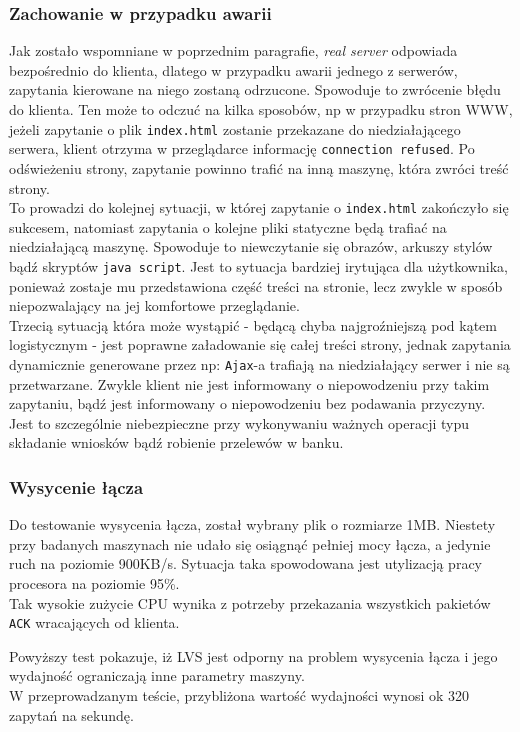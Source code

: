 \subsubsection*{Zachowanie w przypadku awarii}
Jak zostało wspomniane w poprzednim paragrafie, \textit{real server} odpowiada bezpośrednio do klienta, dlatego w przypadku awarii jednego z serwerów, zapytania kierowane na niego zostaną odrzucone.
Spowoduje to zwrócenie błędu do klienta. Ten może to odczuć na kilka sposobów, np w przypadku stron WWW, jeżeli zapytanie o plik \texttt{index.html} zostanie przekazane do niedziałającego serwera, klient otrzyma w przeglądarce informację \texttt{connection refused}.
Po odświeżeniu strony, zapytanie powinno trafić na inną maszynę, która zwróci treść strony.\\
To prowadzi do kolejnej sytuacji, w której zapytanie o \texttt{index.html} zakończyło się sukcesem, natomiast zapytania o kolejne pliki statyczne będą trafiać na niedziałającą maszynę.
Spowoduje to niewczytanie się obrazów, arkuszy stylów bądź skryptów \texttt{java script}.
Jest to sytuacja bardziej irytująca dla użytkownika, ponieważ zostaje mu przedstawiona część treści na stronie, lecz zwykle w sposób niepozwalający na jej komfortowe przeglądanie.\\
Trzecią sytuacją która może wystąpić - będącą chyba najgroźniejszą pod kątem logistycznym - jest poprawne załadowanie się całej treści strony, jednak zapytania dynamicznie generowane przez np: \texttt{Ajax}-a trafiają na niedziałający serwer i nie są przetwarzane.
Zwykle klient nie jest informowany o niepowodzeniu przy takim zapytaniu, bądź jest informowany o niepowodzeniu bez podawania przyczyny.
Jest to szczególnie niebezpieczne przy wykonywaniu ważnych operacji typu składanie wniosków bądź robienie przelewów w banku.
\subsubsection*{Wysycenie łącza}
\label{sub:lvs_wysycenie_lacza}
Do testowanie wysycenia łącza, został wybrany plik o rozmiarze 1MB.
Niestety przy badanych maszynach nie udało się osiągnąć pełniej mocy łącza, a jedynie ruch na poziomie 900KB/s.
Sytuacja taka spowodowana jest utylizacją pracy procesora na poziomie 95\%.\\
Tak wysokie zużycie CPU wynika z potrzeby przekazania wszystkich pakietów \texttt{ACK} wracających od klienta.

Powyższy test pokazuje, iż LVS jest odporny na problem wysycenia łącza i jego wydajność ograniczają inne parametry maszyny.\\
W przeprowadzanym teście, przybliżona wartość wydajności wynosi ok 320 zapytań na sekundę.
